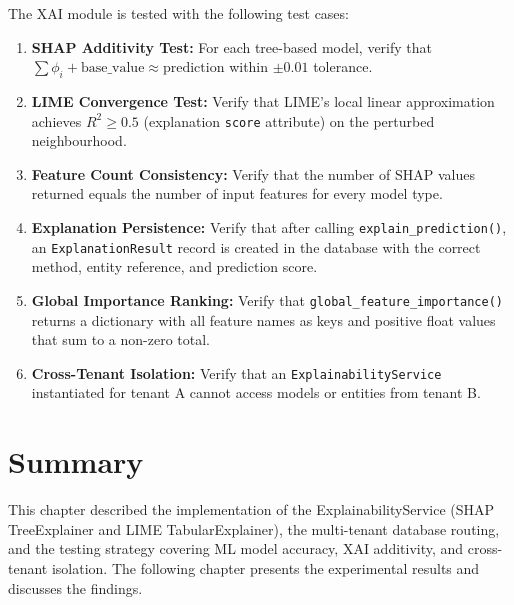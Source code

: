 \documentclass[12pt,a4paper]{report}
\begin{document}
The XAI module is tested with the following test cases:

\begin{enumerate}[label=\arabic*.]
  \item \textbf{SHAP Additivity Test:} For each tree-based model, verify that $\sum \phi_i + \text{base\_value} \approx \text{prediction}$ within $\pm 0.01$ tolerance.

  \item \textbf{LIME Convergence Test:} Verify that LIME's local linear approximation achieves $R^2 \geq 0.5$ (explanation \texttt{score} attribute) on the perturbed neighbourhood.

  \item \textbf{Feature Count Consistency:} Verify that the number of SHAP values returned equals the number of input features for every model type.

  \item \textbf{Explanation Persistence:} Verify that after calling \texttt{explain\_prediction()}, an \texttt{ExplanationResult} record is created in the database with the correct method, entity reference, and prediction score.

  \item \textbf{Global Importance Ranking:} Verify that \texttt{global\_feature\_importance()} returns a dictionary with all feature names as keys and positive float values that sum to a non-zero total.

  \item \textbf{Cross-Tenant Isolation:} Verify that an \texttt{ExplainabilityService} instantiated for tenant A cannot access models or entities from tenant B.
\end{enumerate}

\section{Summary}
\label{sec:impl_summary}

This chapter described the implementation of the ExplainabilityService (SHAP TreeExplainer and LIME TabularExplainer), the multi-tenant database routing, and the testing strategy covering ML model accuracy, XAI additivity, and cross-tenant isolation. The following chapter presents the experimental results and discusses the findings.


%
%
\end{document}
